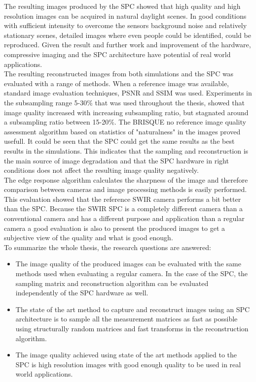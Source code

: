 The resulting images produced by the SPC showed that high quality and high resolution images can be acquired in natural daylight scenes. In good conditions with sufficient intensity to overcome the sensors background noise and relatively stationary scenes, detailed images where even people could be identified, could be reproduced. Given the result and further work and improvement of the hardware, compressive imaging and the SPC architecture have potential of real world applications.\\[0.1in]

The resulting reconstructed images from both simulations and the SPC was evaluated with a range of methods. When a reference image was available, standard image evaluation techniques, PSNR and SSIM was used. Experiments in the subsampling range 5-30\% that was used throughout the thesis, showed that image quality increased with increasing subsampling ratio, but stagnated around a subsampling ratio between 15-20\%. The BRISQUE no reference image quality assessment algorithm based on statistics of "naturalness" in the images proved usefull. It could be seen that the SPC could get the same results as the best results in the simulations. This indicates that the sampling and reconstruction is the main source of image degradation and that the SPC hardware in right conditions does not affect the resulting image quality negatively.\\[0.1in] 

The edge response algorithm calculates the sharpness of the image and therefore comparison between cameras and image processing methods is easily performed. This evaluation showed that the reference SWIR camera performs a bit better than the SPC. Because the SWIR SPC is a completely different camera than a conventional camera and has a different purpose and application than a regular camera a good evaluation is also to present the produced images to get a subjective view of the quality and what is good enough.\\[0.1in]


To summarize the whole thesis, the research questions are answered:


\begin{itemize}
    \item The image quality of the produced images can be evaluated with the same methods used when evaluating a regular camera. In the case of the SPC, the sampling matrix and reconstruction algorithm can be evaluated independently of the SPC hardware as well.
    
    \item The state of the art method to capture and reconstruct images using an SPC architecture is to sample all the measurement matrices as fast as possible using structurally random matrices and fast transforms in the reconstruction algorithm.
    
    \item The image quality achieved using state of the art methods applied to the SPC is high resolution images with good enough quality to be used in real world applications. 
\end{itemize}







